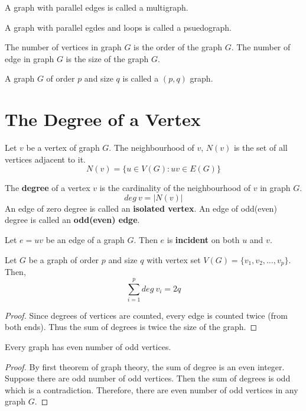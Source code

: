 \begin{definition}[multigraph]
	A graph with parallel edges is called a multigraph.
\end{definition}
\begin{definition}[psueudograph]
	A graph with parallel egdes and loops is called a psuedograph.
\end{definition}

\begin{definition}
	The number of vertices in graph $G$ is the order of the graph $G$.
	The number of edge in graph $G$ is the size of the graph $G$.
\end{definition}
\begin{remark}
	A graph $G$ of order $p$ and size $q$ is called a $(p,q)$ graph.
\end{remark}

\section{The Degree of a Vertex}
\begin{definition}[neighbourhood]
	Let $v$ be a vertex of graph $G$.
	The neighbourhood of $v$, $N(v)$ is the set of all vertices adjacent to it.
	$$ N(v) = \{ u \in V(G) : uv \in E(G) \} $$
\end{definition}
\begin{remark}
	The \textbf{degree} of a vertex $v$ is the cardinality of the neighbourhood of $v$ in graph $G$.
	$$ deg\ v = |N(v)| $$
	An edge of zero degree is called an \textbf{isolated vertex}.
	An edge of odd(even) degree is called an \textbf{odd(even) edge}.
\end{remark}

\begin{remark}
	Let $e=uv$ be an edge of a graph $G$.
	Then $e$ is \textbf{incident} on both $u$ and $v$.
\end{remark}

\begin{theorem}
	Let $G$ be a graph of order $p$ and size $q$ with vertex set $V(G) = \{ v_1,v_2,\dots,v_p \}$.
	Then,
	$$ \sum_{i=1}^p deg\ v_i = 2q $$
\end{theorem}
\begin{proof}
	Since degrees of vertices are counted, every edge is counted twice (from both ends). Thus the sum of degrees is twice the size of the graph.
\end{proof}

\begin{corollary}
	Every graph has even number of odd vertices.
\end{corollary}
\begin{proof}
	By first theorem of graph theory, the sum of degree is an even integer.
	Suppose there are odd number of odd vertices.
	Then the sum of degrees is odd which is a contradiction.
	Therefore, there are even number of odd vertices in any graph $G$.
\end{proof}

